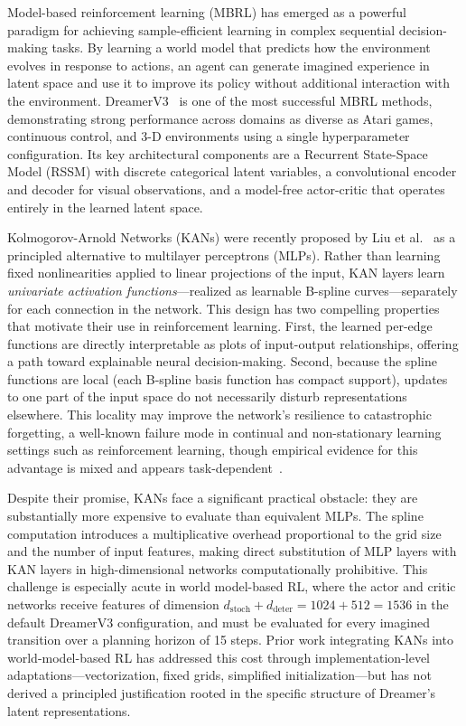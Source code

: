 \documentclass[11pt, a4paper]{article}
\begin{document}
Model-based reinforcement learning (MBRL) has emerged as a powerful paradigm
for achieving sample-efficient learning in complex sequential decision-making
tasks. By learning a world model that predicts how the environment evolves in
response to actions, an agent can generate imagined experience in latent space
and use it to improve its policy without additional interaction with the
environment. DreamerV3~\cite{hafner2023dreamerv3} is one of the most successful
MBRL methods, demonstrating strong performance across domains as diverse as
Atari games, continuous control, and 3-D environments using a single
hyperparameter configuration. Its key architectural components are a Recurrent
State-Space Model (RSSM) with discrete categorical latent variables, a
convolutional encoder and decoder for visual observations, and a model-free
actor-critic that operates entirely in the learned latent space.

Kolmogorov-Arnold Networks (KANs) were recently proposed by Liu et
al.~\cite{liu2024kan} as a principled alternative to multilayer perceptrons
(MLPs). Rather than learning fixed nonlinearities applied to linear projections
of the input, KAN layers learn \emph{univariate activation functions}---realized
as learnable B-spline curves---separately for each connection in the network.
This design has two compelling properties that motivate their use in
reinforcement learning. First, the learned per-edge functions are directly
interpretable as plots of input-output relationships, offering a path toward
explainable neural decision-making. Second, because the spline functions are
local (each B-spline basis function has compact support), updates to one part
of the input space do not necessarily disturb representations elsewhere. This
locality may improve the network's resilience to catastrophic forgetting, a
well-known failure mode in continual and non-stationary learning settings such
as reinforcement learning, though empirical evidence for this advantage is mixed
and appears task-dependent~\cite{kanvmlp2024, kanforgetting2024}.

Despite their promise, KANs face a significant practical obstacle: they are
substantially more expensive to evaluate than equivalent MLPs. The spline
computation introduces a multiplicative overhead proportional to the grid size
and the number of input features, making direct substitution of MLP layers with
KAN layers in high-dimensional networks computationally prohibitive. This
challenge is especially acute in world model-based RL, where the actor and
critic networks receive features of dimension $d_{\text{stoch}} +
d_{\text{deter}} = 1024 + 512 = 1536$ in the default DreamerV3 configuration,
and must be evaluated for every imagined transition over a planning horizon of
15 steps. Prior work integrating KANs into world-model-based RL has addressed
this cost through implementation-level adaptations---vectorization, fixed grids,
simplified initialization---but has not derived a principled justification
rooted in the specific structure of Dreamer's latent representations.
\end{document}
